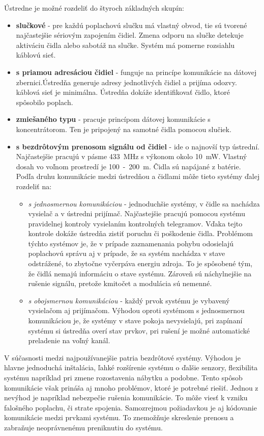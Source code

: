 Ústredne je možné rozdeliť do štyroch základných skupín:
\begin{itemize}
    \item \textbf{slučkové} - pre každú poplachovú slučku má vlastný obvod, tie sú tvorené najčastejšie sériovým zapojením čidiel. Zmena odporu na slučke detekuje aktiváciu čidla alebo sabotáž na slučke. Systém má pomerne rozsiahlu káblovú sieť.
    \item \textbf{s priamou adresáciou čidiel} - funguje na princípe komunikácie na dátovej zbernici.Ústredňa generuje adresy jednotlivých čidiel a prijíma odozvy. káblová sieť je minimálna. Ústredňa dokáže identifikovať čidlo, ktoré spôsobilo poplach.
    \item \textbf{zmiešaného typu} - pracuje princípom dátovej komunikácie s koncentrátorom. Ten je pripojený na samotné čidla pomocou slučiek.
    \item \textbf{s bezdrôtovým prenosom signálu od čidiel} - ide o najnovší typ ústrední. Najčastejšie pracujú v pásme 433~MHz s výkonom okolo 10~mW. Vlastný dosah vo voľnom prostredí je 100~-~200~m. Čidla sú napájané z batérie.
    Podľa druhu komunikácie medzi ústredňou a čidlami môže tieto systémy ďalej rozdeliť na:
    \begin{itemize}
        \item \textit{s jednosmernou komunikáciou} - jednoduchšie systémy, v čidle sa nachádza vysielač a v ústredni prijímač. Najčastejšie pracujú pomocou systému pravidelnej kontroly vysielaním kontrolných telegramov. Vďaka tejto kontrole dokáže ústredňa zistiť poruchu či poškodenie čidla. Problémom týchto systémov je, že v prípade zaznamenania pohybu odosielajú poplachovú správu aj v prípade, že sa systém nachádza v stave odstrážené, to zbytočne vyčerpáva energiu zdroja. To je spôsobené tým, že čidlá nemajú informáciu o stave systému. Zároveň sú náchylnejšie na rušenie signálu, pretože kmitočet a modulácia sú nemenné.
        \item \textit{s obojsmernou komunikáciou} - každý prvok systému je vybavený vysielačom aj prijímačom. Výhodou oproti systémom s jednosmernou komunikáciou je, že systémy v stave pokoja nevysielajú, pri zapínaní systému si ústredňa overí stav prvkov, pri rušení je možné automatické preladenie na voľný kanál.
    \end{itemize}
\end{itemize}

V súčasnosti medzi najpoužívanejšie patria bezdrôtové systémy. Výhodou je hlavne jednoduchá inštalácia, ľahké rozšírenie systému o ďalšie senzory, flexibilita systému napríklad pri zmene rozostavenia nábytku a podobne. Tento spôsob komunikácie však prináša aj mnoho problémov, ktoré je potrebné riešiť. Jednou z nevýhod je napríklad nebezpečie rušenia komunikácie. To môže viesť k vzniku falošného poplachu, či strate spojenia. Samozrejmou požiadavkou je aj kódovanie komunikácie medzi prvkami systému. To znemožňuje skreslenie prenosu a zabraňuje neoprávnenému preniknutiu do systému.\cite{Krecek}


